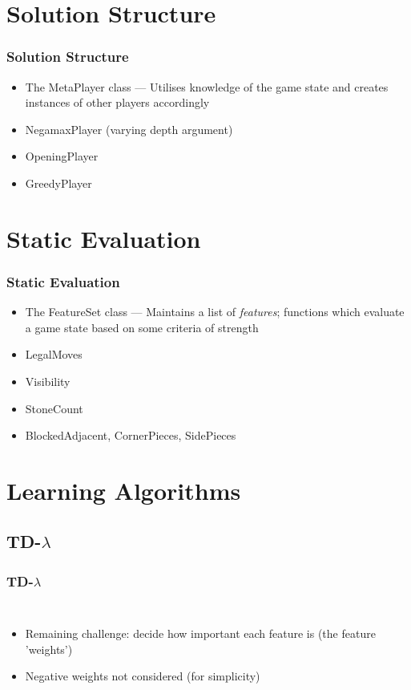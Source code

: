 \documentclass[10pt]{beamer}
\begin{document}
\section{Solution Structure}

\begin{frame}
  \frametitle{Solution Structure}   %
  \begin{itemize}
  \item<1-> The MetaPlayer class --- Utilises knowledge of the game state and 
        creates instances of other players accordingly
  \item<2-> NegamaxPlayer (varying depth argument)
  \item<2-> OpeningPlayer
  \item<2-> GreedyPlayer
  \end{itemize}
\end{frame}

\section{Static Evaluation}

\begin{frame}
  \frametitle{Static Evaluation}   %
  \begin{itemize}
  \item<1-> The FeatureSet class --- Maintains a list of \emph{features}; functions
  which evaluate a game state based on some criteria of strength
  \item<2-> LegalMoves
  \item<2-> Visibility
  \item<2-> StoneCount
  \item<2-> BlockedAdjacent, CornerPieces, SidePieces
  \end{itemize}
\end{frame}

\section{Learning Algorithms}

\subsection{TD-$\lambda$}

\begin{frame}
  \frametitle{TD-$\lambda$}
  \begin{columns}[c]
  \column{2in}  %
  \begin{itemize}
  \item<1-> Remaining challenge: decide how important each feature is (the feature 'weights')
  \item<1-> Negative weights not considered (for simplicity)
  \end{itemize}
  \column{2in}
  \end{columns}
\end{frame}
\end{document}
